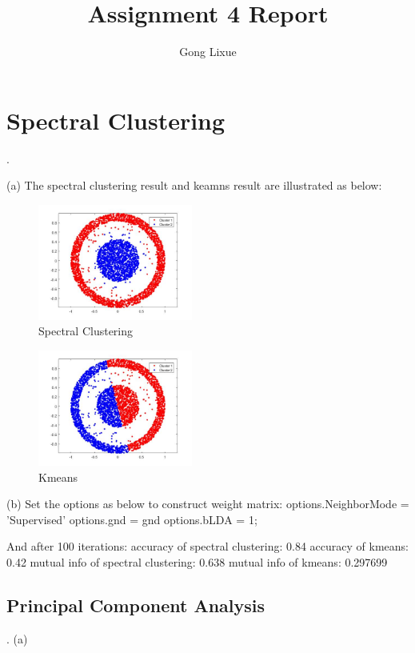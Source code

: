 \documentclass[11pt]{article} %
\title{Assignment 4 Report}
\author{Gong Lixue}
\begin{document}
\maketitle

\section{Spectral Clustering}
.

(a)  The spectral clustering result and keamns result are illustrated as below:
\begin{figure}[h]
\centering
\includegraphics[width=2in]{spectral_cluster.jpg}  %
\caption{Spectral Clustering}
\label{fig1}
\end{figure}

\begin{figure}[h]
\centering
\includegraphics[width=2in]{kmeans.jpg}  %
\caption{Kmeans}
\label{fig1}
\end{figure}

(b) Set the options as below to construct weight matrix:
options.NeighborMode = 'Supervised'
options.gnd = gnd
options.bLDA = 1;

And after 100 iterations:
accuracy of spectral clustering: 0.84
accuracy of kmeans: 0.42
mutual info of spectral clustering: 0.638
mutual info of kmeans: 0.297699

\subsection{Principal Component Analysis}
.
(a) 
\end{document}
